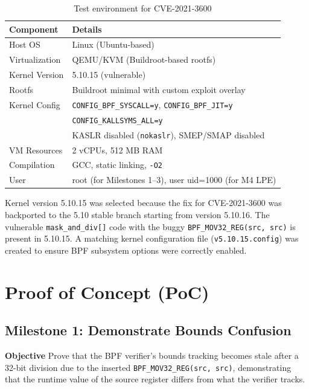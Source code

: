 \begin{table}[H]
\centering
\begin{tabular}{@{}ll@{}}
\toprule
\textbf{Component} & \textbf{Details} \\
\midrule
Host OS & Linux (Ubuntu-based) \\
Virtualization & QEMU/KVM (Buildroot-based rootfs) \\
Kernel Version & 5.10.15 (vulnerable) \\
Rootfs & Buildroot minimal with custom exploit overlay \\
Kernel Config & \texttt{CONFIG\_BPF\_SYSCALL=y}, \texttt{CONFIG\_BPF\_JIT=y} \\
& \texttt{CONFIG\_KALLSYMS\_ALL=y} \\
& KASLR disabled (\texttt{nokaslr}), SMEP/SMAP disabled \\
VM Resources & 2 vCPUs, 512 MB RAM \\
Compilation & GCC, static linking, \texttt{-O2} \\
User & root (for Milestones 1--3), user uid=1000 (for M4 LPE) \\
\bottomrule
\end{tabular}
\caption{Test environment for CVE-2021-3600}
\end{table}

Kernel version 5.10.15 was selected because the fix for CVE-2021-3600 was backported to the 5.10 stable branch starting from version 5.10.16. The vulnerable \texttt{mask\_\allowbreak and\_\allowbreak div[]} code with the buggy \texttt{BPF\_\allowbreak MOV32\_\allowbreak REG\allowbreak (src, \allowbreak src)} is present in 5.10.15. A matching kernel configuration file (\texttt{v5.10.15.config}) was created to ensure BPF subsystem options were correctly enabled.


\section{Proof of Concept (PoC)}

\subsection{Milestone 1: Demonstrate Bounds Confusion}

\textbf{Objective}
Prove that the BPF verifier's bounds tracking becomes stale after a 32-bit division due to the inserted \texttt{BPF\_MOV32\_REG(src, src)}, demonstrating that the runtime value of the source register differs from what the verifier tracks.

